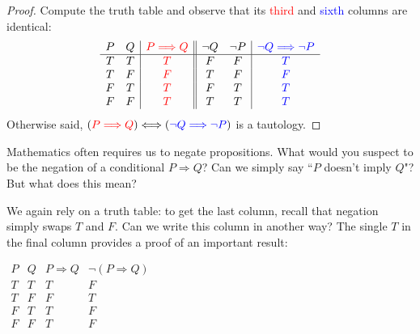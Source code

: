 \begin{proof}
	Compute the truth table and observe that its \textcolor{red}{third} and \textcolor{blue}{sixth} columns are identical:
	\begin{gather*}
		\begin{array}{cc|c||cc|c}
			P & Q & \textcolor{red}{P\Longrightarrow Q} & \neg Q & \neg P & \textcolor{blue}{\neg Q\Longrightarrow\neg P}\\\hline
			T & T & \textcolor{red}{T} & F & F & \textcolor{blue}{T}\\
			T & F & \textcolor{red}{F} & T & F & \textcolor{blue}{F}\\
			F & T & \textcolor{red}{T} & F & T & \textcolor{blue}{T}\\
			F & F & \textcolor{red}{T} & T & T & \textcolor{blue}{T}
		\end{array}
	\end{gather*}
	Otherwise said, $(\textcolor{red}{P\Longrightarrow Q})\Longleftrightarrow (\textcolor{blue}{\neg Q\Longrightarrow\neg P})$ is a tautology.
\end{proof}


 

Mathematics often requires us to negate propositions. What would you suspect to be the negation of a conditional $P\Longrightarrow Q$? Can we simply say ``$P$ doesn't imply $Q$"? But what does this mean? 

\begin{minipage}[t]{0.64\linewidth}\vspace{-2pt}
	We again rely on a truth table: to get the last column, recall that negation simply swaps $T$ and $F$. Can we write this column in another way? The single $T$ in the final column provides a proof of an important result:
\end{minipage}
\hfill
\begin{minipage}[t]{0.35\linewidth}\vspace{-5pt}
	\flushright%
	$\begin{array}{cc|c|c}
		P & Q & P\Longrightarrow Q & \neg(P\Longrightarrow Q)\\\hline
		T & T & T & F\\
		T & F & F & T\\
		F & T & T & F\\
		F & F & T & F
	\end{array}$
\end{minipage}

